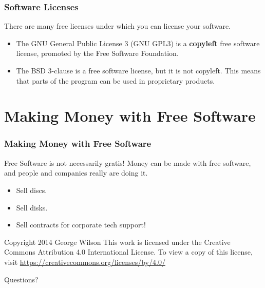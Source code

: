 \documentclass{beamer}
\begin{document}
\begin{frame}
\frametitle{Software Licenses}

There are many free licenses under which you can license your software.

\begin{itemize}
\item<+-> The GNU General Public License 3 (GNU GPL3) is a {\bf copyleft} 
  free software license, promoted by the Free Software Foundation.
\item<+-> The BSD 3-clause is a free software license, but it is not copyleft.
  This means that parts of the program can be used in proprietary products.
\end{itemize}

\end{frame}

\section{Making Money with Free Software}

\begin{frame}
\frametitle{Making Money with Free Software}

Free Software is not necessarily gratis! Money can be made with free 
software, and people and companies really are doing it.

\begin{itemize}
\item<+-> Sell discs.
\item<+-> Sell disks.
\item<+-> Sell contracts for corporate tech support!
\end{itemize}

\end{frame}


\begin{frame}
Copyright 2014 George Wilson
This work is licensed under the Creative Commons Attribution 4.0 
International License. To view a copy of this license, visit 
\href{https://creativecommons.org/licenses/by/4.0/}{https://creativecommons.org/licenses/by/4.0/}
\end{frame}

\begin{frame}
\Huge{\centerline{Questions?}}
\end{frame}

\end{document}
